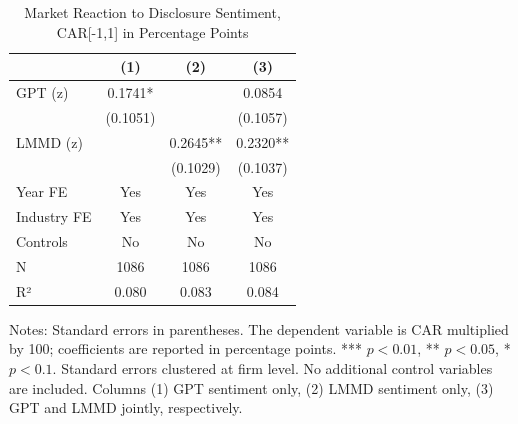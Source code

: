 \begin{table}[htbp]
\centering
\caption{Market Reaction to Disclosure Sentiment, CAR[-1,1] in Percentage Points}
\label{tab:car_sentiment_main}
\begin{tabular}{lccc}
\toprule
 & (1) & (2) & (3) \\
\midrule
GPT (z) & 0.1741* &  & 0.0854 \\
  & (0.1051) &  & (0.1057) \\
LMMD (z) &  & 0.2645** & 0.2320** \\
  &  & (0.1029) & (0.1037) \\
\midrule
Year FE & Yes & Yes & Yes \\
Industry FE & Yes & Yes & Yes \\
Controls & No & No & No \\
N & 1086 & 1086 & 1086 \\
R² & 0.080 & 0.083 & 0.084 \\
\bottomrule
\end{tabular}\begin{flushleft}
\footnotesize Notes: Standard errors in parentheses. The dependent variable is CAR multiplied by 100; coefficients are reported in percentage points. *** $p<0.01$, ** $p<0.05$, * $p<0.1$. Standard errors clustered at firm level. No additional control variables are included. Columns (1) GPT sentiment only, (2) LMMD sentiment only, (3) GPT and LMMD jointly, respectively.
\end{flushleft}
\end{table}